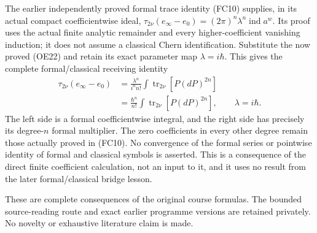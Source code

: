 \documentclass[
  11pt,
]{article}
\begin{document}
The earlier independently proved formal trace identity (FC10) supplies,
in its actual compact coefficientwise ideal, \(\tau_{2\nu}(e_\infty-e_0)
=(2\pi)^n\lambda^n\operatorname{ind}a^w\). Its proof uses the actual
finite analytic remainder and every higher-coefficient vanishing
induction; it does not assume a classical Chern identification.
Substitute the now proved (OE22) and retain its exact parameter map
\(\lambda=i\hbar\). This gives the complete formal/classical receiving
identity \[
\begin{split}
\tau_{2\nu}(e_\infty-e_0)
 &=\frac{\lambda^n}{i^n n!}
           \int\operatorname{tr}_{2\nu}[P(dP)^{2n}]\\
 &=\frac{\hbar^n}{n!}
           \int\operatorname{tr}_{2\nu}[P(dP)^{2n}],
                     \qquad\lambda=i\hbar .
\end{split}
\tag{OE23}
\] The left side is a formal coefficientwise integral, and the right
side has precisely its degree-\(n\) formal multiplier. The zero
coefficients in every other degree remain those actually proved in
(FC10). No convergence of the formal series or pointwise identity of
formal and classical symbols is asserted. This is a consequence of the
direct finite coefficient calculation, not an input to it, and it uses
no result from the later formal/classical bridge lesson.

These are complete consequences of the original course formulas. The
bounded source-reading route and exact earlier programme versions are
retained privately. No novelty or exhaustive literature claim is made.
\end{document}
